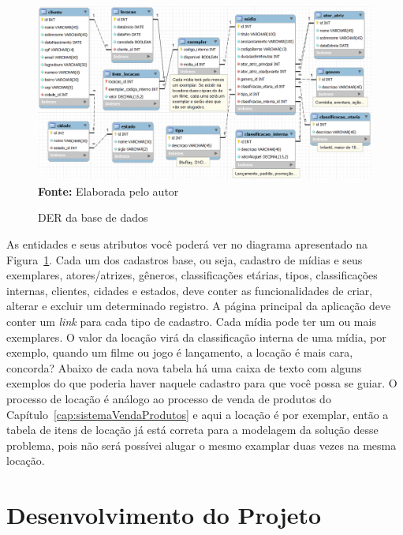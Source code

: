 \FloatBarrier
\begin{figure}[!htbp]
    \centering
    \caption{DER da base de dados}
    \includegraphics[scale=0.45]{imagens/cap09DER}
    \\\textbf{Fonte:} Elaborada pelo autor
    \label{fig:cap09DER}
\end{figure}
\FloatBarrier

As entidades e seus atributos você poderá ver no diagrama apresentado na Figura~\ref{fig:cap09DER}. Cada um dos cadastros base, ou seja, cadastro de mídias e seus exemplares, atores/atrizes, gêneros, classificações etárias, tipos, classificações internas, clientes, cidades e estados, deve conter as funcionalidades de criar, alterar e excluir um determinado registro. A página principal da aplicação deve conter um \textit{link} para cada tipo de cadastro. Cada mídia pode ter um ou mais exemplares. O valor da locação virá da classificação interna de uma mídia, por exemplo, quando um filme ou jogo é lançamento, a locação é mais cara, concorda? Abaixo de cada nova tabela há uma caixa de texto com alguns exemplos do que poderia haver naquele cadastro para que você possa se guiar. O processo de locação é análogo ao processo de venda de produtos do Capítulo~\ref{cap:sistemaVendaProdutos} e aqui a locação é por exemplar, então a tabela de itens de locação já está correta para a modelagem da solução desse problema, pois não será possívei alugar o mesmo examplar duas vezes na mesma locação.


\section{Desenvolvimento do Projeto}

